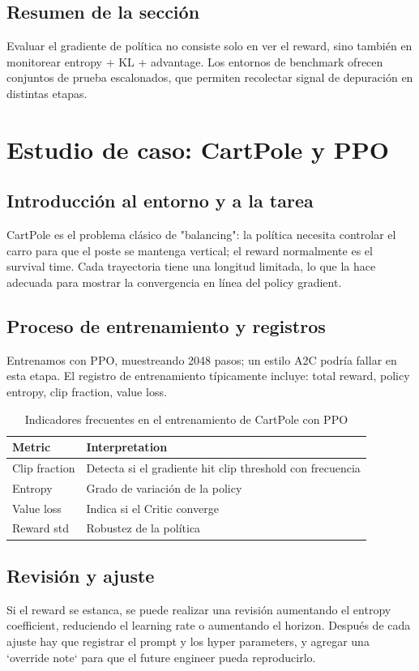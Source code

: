 \documentclass[a4paper]{article}
\begin{document}
\subsection{Resumen de la sección}
Evaluar el gradiente de política no consiste solo en ver el reward, sino también en monitorear entropy + KL + advantage. Los entornos de benchmark ofrecen conjuntos de prueba escalonados, que permiten recolectar signal de depuración en distintas etapas.

\section{Estudio de caso: CartPole y PPO}
\subsection{Introducción al entorno y a la tarea}
CartPole es el problema clásico de "balancing": la política necesita controlar el carro para que el poste se mantenga vertical; el reward normalmente es el survival time. Cada trayectoria tiene una longitud limitada, lo que la hace adecuada para mostrar la convergencia en línea del policy gradient.

\subsection{Proceso de entrenamiento y registros}
Entrenamos con PPO, muestreando 2048 pasos; un estilo A2C podría fallar en esta etapa. El registro de entrenamiento típicamente incluye: total reward, policy entropy, clip fraction, value loss.
\begin{table}[H]
\centering
\small
\begin{tabular}{p{}p{}}
\toprule
Metric & Interpretation \\
\midrule
Clip fraction & Detecta si el gradiente hit clip threshold con frecuencia \\
Entropy & Grado de variación de la policy \\
Value loss & Indica si el Critic converge \\
Reward std & Robustez de la política \\
\bottomrule
\end{tabular}
\caption{Indicadores frecuentes en el entrenamiento de CartPole con PPO}
\end{table}

\subsection{Revisión y ajuste}
Si el reward se estanca, se puede realizar una revisión aumentando el entropy coefficient, reduciendo el learning rate o aumentando el horizon. Después de cada ajuste hay que registrar el prompt y los hyper parameters, y agregar una `override note` para que el future engineer pueda reproducirlo.
\end{document}
